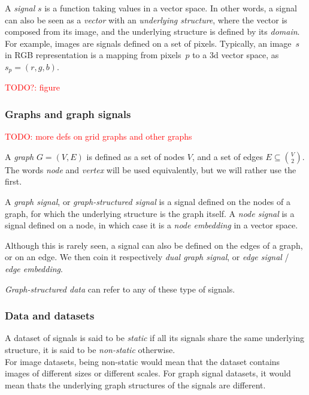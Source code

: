 A \emph{signal} $s$ is a function taking values in a vector space. In other words, a signal can also be seen as a \emph{vector} with an \emph{underlying structure}, where the vector is composed from its image, and the underlying structure is defined by its \emph{domain}.\\

For example, images are signals defined on a set of pixels. Typically, an image~$s$ in RGB representation is a mapping from pixels~$p$ to a 3d vector space, as $s_p = (r,g,b)$.

\textcolor{red}{TODO?: figure}
\begin{figure}

\end{figure}

\subsubsection{Graphs and graph signals}

%
\textcolor{red}{TODO: more defs on grid graphs and other graphs}
%

A \emph{graph} $G = (V, E)$ is defined as a set of nodes $V$, and a set of edges $E \subseteq\binom{V}{2}$. The words \emph{node} and \emph{vertex} will be used equivalently, but we will rather use the first.

A \emph{graph signal}, or \emph{graph-structured signal} is a signal defined on the nodes of a graph, for which the underlying structure is the graph itself.
A \emph{node signal} is a signal defined on a node, in which case it is a \emph{node embedding} in a vector space.

Although this is rarely seen, a signal can also be defined on the edges of a graph, or on an edge. We then coin it respectively \emph{dual graph signal}, or \emph{edge signal} / \emph{edge embedding}.

\emph{Graph-structured data} can refer to any of these type of signals.

\subsubsection{Data and datasets}

A dataset of signals is said to be \emph{static} if all its signals share the same underlying structure, it is said to be \emph{non-static} otherwise.\\
For image datasets, being non-static would mean that the dataset contains images of different sizes or different scales. For graph signal datasets, it would mean thats the underlying graph structures of the signals are different.

